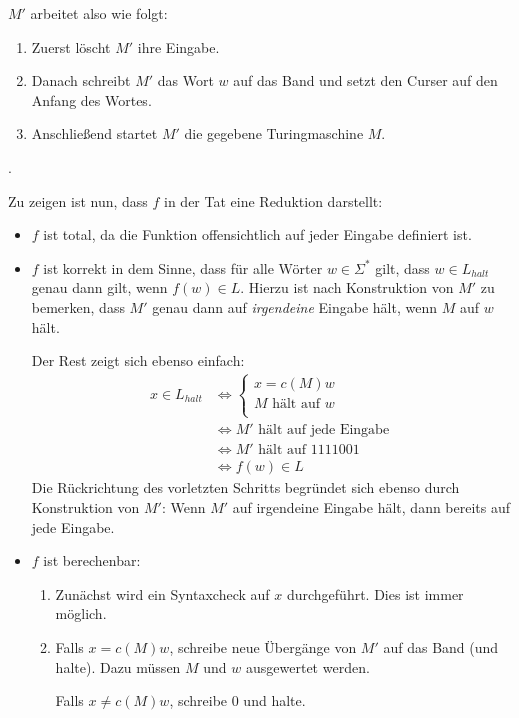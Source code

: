 \begin{example}
	$M'$ arbeitet also wie folgt:
	\begin{enumerate}
		\item
			Zuerst löscht $M'$ ihre Eingabe.
		\item
			Danach schreibt $M'$ das Wort $w$ auf das Band und setzt
			den Curser auf den Anfang des Wortes.
		\item
			Anschließend startet $M'$ die gegebene Turingmaschine
			$M$.
	\end{enumerate}.

	Zu zeigen ist nun, dass $f$ in der Tat eine Reduktion darstellt:
	\begin{itemize}
		\item
			$f$ ist total, da die Funktion offensichtlich auf jeder
			Eingabe definiert ist.
		\item
			$f$ ist korrekt in dem Sinne, dass für alle Wörter $w
			\in \Sigma^*$ gilt, dass $w \in L_{halt}$ genau dann
			gilt, wenn $f(w) \in L$. Hierzu ist nach Konstruktion
			von $M'$ zu bemerken, dass $M'$ genau dann auf 
			\textit{irgendeine} Eingabe hält, wenn $M$ auf $w$ hält.

			Der Rest zeigt sich ebenso einfach:
			\begin{align*}
				x \in L_{halt}
				& \Longleftrightarrow
				\begin{cases}
					x = c(M)w \\
					M \text{ hält auf }  w \\
				\end{cases} \\
				& \Longleftrightarrow M' \text{ hält auf jede
				Eingabe } \\
				& \Longleftrightarrow M' \text{ hält auf }
				1111001
				\\
				& \Longleftrightarrow f(w) \in L
			\end{align*}
			Die Rückrichtung des vorletzten Schritts begründet sich 
			ebenso durch Konstruktion von $M'$: Wenn $M'$ auf
			irgendeine Eingabe hält, dann bereits auf jede Eingabe.
		\item
			$f$ ist berechenbar:
			\begin{enumerate}
				\item
					Zunächst wird ein Syntaxcheck auf $x$
					durchgeführt. Dies ist immer möglich.
				\item
					Falls $x = c(M)w$, schreibe neue
					Übergänge von $M'$ auf das Band (und
					halte). Dazu
					müssen $M$ und $w$ ausgewertet werden.

					Falls $x \neq c(M)w$, schreibe $0$ und
					halte.
			\end{enumerate}
	\end{itemize}


\end{example}
